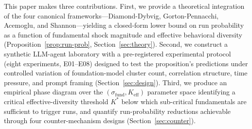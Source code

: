 This paper makes three contributions. First, we provide a theoretical integration of the four canonical frameworks---Diamond-Dybvig, Gorton-Pennacchi, Acemoglu, and Shannon---yielding a closed-form lower bound on run probability as a function of fundamental shock magnitude and effective behavioral diversity (Proposition~\ref{prop:run-prob}, Section~\ref{sec:theory}). Second, we construct a synthetic LLM-agent laboratory with a pre-registered experimental protocol (eight experiments, E01--E08) designed to test the proposition's predictions under controlled variation of foundation-model cluster count, correlation structure, time pressure, and prompt framing (Section~\ref{sec:design}). Third, we produce an empirical phase diagram over the $(\sigma_{\text{fund}}, K_{\text{eff}})$ parameter space identifying a critical effective-diversity threshold $K^*$ below which sub-critical fundamentals are sufficient to trigger runs, and quantify run-probability reductions achievable through four counter-mechanism designs (Section~\ref{sec:counter}).

